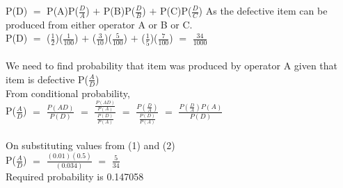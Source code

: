 \documentclass[]{article}
\begin{document}
P(D) $=$ P(A)P($\frac{D}{A}$) $+$ P(B)P($\frac{D}{B}$) $+$  P(C)P($\frac{D}{C}$)  As the defective item can be produced from either operator A or B or C.\\
P(D) $=$ ($\frac{1}{2}$)($\frac{1}{100}$) $+$ ($\frac{3}{10}$)($\frac{5}{100}$) $+$ ($\frac{1}{5}$)($\frac{7}{100}$) $=$ $\frac{34}{1000}$ \\ \\
We need to find probability that item was produced by operator A given that item is defective P($\frac{A}{D}$)\\
From conditional probability, \\
P($\frac{A}{D}$) $=$ $\frac{P(AD)}{P(D)}$ $=$ 
$\frac{\frac{P(AD)}{P(A)}}{\frac{P(D)}{P(A)}}$ $=$ $\frac{P(\frac{D}{A})}{\frac{P(D)}{P(A)}}$ $=$
$\frac{P(\frac{D}{A})P(A)}{P(D)}$ \\ \\
On substituting values from (1) and (2) \\
P($\frac{A}{D}$) $=$ $\frac{(0.01)(0.5)}{(0.034)}$ $=$ $\frac{5}{34}$\\ 
Required probability is 0.147058
\end{document}
